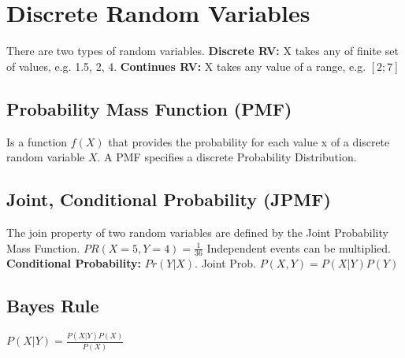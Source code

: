 \section{Discrete Random Variables}
There are two types of random variables.
\textbf{Discrete RV:} X takes any of finite set of values, e.g. {1.5, 2, 4}.
\textbf{Continues RV:} X takes any value of a range, e.g. $[2;7]$

\subsection{Probability Mass Function (PMF)}
Is a function $f(X)$ that provides the probability for each value x of a discrete random variable $X$. A PMF specifies a discrete Probability Distribution. 
\subsection{Joint, Conditional Probability (JPMF)}
The join property of two random variables are defined by the Joint Probability Mass Function. $PR(X=5, Y=4) = \frac{1}{36}$ Independent events can be multiplied. \\
\textbf{Conditional Probability:} $Pr(Y|X)$. Joint Prob. $P(X,Y) = P(X|Y)P(Y)$

\subsection{Bayes Rule}
$P(X|Y)=\frac{P(X|Y)P(X)}{P(X)}$